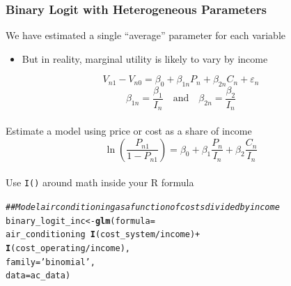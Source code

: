 \documentclass{beamer}\usepackage[]{graphicx}\usepackage[]{color}
\makeatletter
\newcommand{\hlstr}[1]{\textcolor[rgb]{0.192,0.494,0.8}{#1}}%
\newcommand{\hlcom}[1]{\textcolor[rgb]{0.678,0.584,0.686}{\textit{#1}}}%
\newcommand{\hlopt}[1]{\textcolor[rgb]{0,0,0}{#1}}%
\newcommand{\hlstd}[1]{\textcolor[rgb]{0.345,0.345,0.345}{#1}}%
\newcommand{\hlkwb}[1]{\textcolor[rgb]{0.69,0.353,0.396}{#1}}%
\newcommand{\hlkwc}[1]{\textcolor[rgb]{0.333,0.667,0.333}{#1}}%
\newcommand{\hlkwd}[1]{\textcolor[rgb]{0.737,0.353,0.396}{\textbf{#1}}}%
\newenvironment{kframe}{%
 \def\at@end@of@kframe{}%
 \ifinner\ifhmode%
  \def\at@end@of@kframe{\end{minipage}}%
  \begin{minipage}{\columnwidth}%
 \fi\fi%
 \def\FrameCommand##1{\hskip\@totalleftmargin \hskip-\fboxsep
 \colorbox{shadecolor}{##1}\hskip-\fboxsep
     \hskip-\linewidth \hskip-\@totalleftmargin \hskip\columnwidth}%
 \MakeFramed {\advance\hsize-\width
   \@totalleftmargin\z@ \linewidth\hsize
   \@setminipage}}%
 {\par\unskip\endMakeFramed%
 \at@end@of@kframe}
\newenvironment{knitrout}{}{} %
\makeatother
\begin{document}
\begin{frame}[fragile]\frametitle{Binary Logit with Heterogeneous Parameters}
    We have estimated a single ``average'' parameter for each variable
    \begin{itemize}
        \item But in reality, marginal utility is likely to vary by income
    \end{itemize}
    $$V_{n1} - V_{n0} = \beta_0 + \beta_{1n} P_n + \beta_{2n} C_n + \varepsilon_n$$
    $$\beta_{1n} = \frac{\beta_1}{I_n} \quad \text{and} \quad \beta_{2n} = \frac{\beta_2}{I_n}$$ \\
    \vspace{1ex}
    Estimate a model using price or cost as a share of income
    $$\ln \left( \frac{P_{n1}}{1 - P_{n1}} \right) = \beta_0 + \beta_1 \frac{P_n}{I_n} + \beta_2 \frac{C_n}{I_n}$$ \\
    \vspace{1ex}
    Use \texttt{I()} around math inside your R formula
\begin{knitrout}\footnotesize
{}\color{fgcolor}\begin{kframe}
\begin{alltt}
\hlcom{## Model air conditioning as a function of costs divided by income}
\hlstd{binary_logit_inc} \hlkwb{<-} \hlkwd{glm}\hlstd{(}\hlkwc{formula} \hlstd{=}
                          \hlstd{air_conditioning} \hlopt{~} \hlkwd{I}\hlstd{(cost_system} \hlopt{/} \hlstd{income)} \hlopt{+}
                          \hlkwd{I}\hlstd{(cost_operating} \hlopt{/} \hlstd{income),}
                        \hlkwc{family} \hlstd{=} \hlstr{'binomial'}\hlstd{,}
                        \hlkwc{data} \hlstd{= ac_data)}
\end{alltt}
\end{kframe}
\end{knitrout}
\end{frame}
\end{document}
